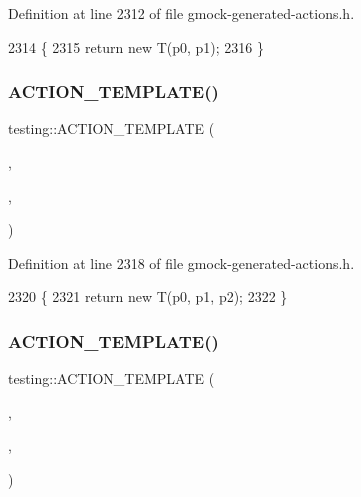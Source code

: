 Definition at line 2312 of file gmock-\/generated-\/actions.\+h.


\begin{DoxyCode}
2314                                             \{
2315   \textcolor{keywordflow}{return} \textcolor{keyword}{new} T(p0, p1);
2316 \}
\end{DoxyCode}
\mbox{\label{namespacetesting_ac24511eb64ebe2c2927feaf285ac3785}} 
\subsubsection{\texorpdfstring{A\+C\+T\+I\+O\+N\+\_\+\+T\+E\+M\+P\+L\+A\+T\+E()}{ACTION\_TEMPLATE()}\hspace{0.1cm}{\footnotesize\ttfamily [21/28]}}
{\footnotesize\ttfamily testing\+::\+A\+C\+T\+I\+O\+N\+\_\+\+T\+E\+M\+P\+L\+A\+TE (\begin{DoxyParamCaption}\item[{Return\+New}]{,  }\item[{H\+A\+S\+\_\+1\+\_\+\+T\+E\+M\+P\+L\+A\+T\+E\+\_\+\+P\+A\+R\+A\+MS(typename, T)}]{,  }\item[{A\+N\+D\+\_\+3\+\_\+\+V\+A\+L\+U\+E\+\_\+\+P\+A\+R\+A\+MS(p0, p1, p2)}]{ }\end{DoxyParamCaption})}



Definition at line 2318 of file gmock-\/generated-\/actions.\+h.


\begin{DoxyCode}
2320                                                 \{
2321   \textcolor{keywordflow}{return} \textcolor{keyword}{new} T(p0, p1, p2);
2322 \}
\end{DoxyCode}
\mbox{\label{namespacetesting_afc5a3710d11bdee2023d8402b84d86ed}} 
\subsubsection{\texorpdfstring{A\+C\+T\+I\+O\+N\+\_\+\+T\+E\+M\+P\+L\+A\+T\+E()}{ACTION\_TEMPLATE()}\hspace{0.1cm}{\footnotesize\ttfamily [22/28]}}
{\footnotesize\ttfamily testing\+::\+A\+C\+T\+I\+O\+N\+\_\+\+T\+E\+M\+P\+L\+A\+TE (\begin{DoxyParamCaption}\item[{Return\+New}]{,  }\item[{H\+A\+S\+\_\+1\+\_\+\+T\+E\+M\+P\+L\+A\+T\+E\+\_\+\+P\+A\+R\+A\+MS(typename, T)}]{,  }\item[{A\+N\+D\+\_\+4\+\_\+\+V\+A\+L\+U\+E\+\_\+\+P\+A\+R\+A\+MS(p0, p1, p2, p3)}]{ }\end{DoxyParamCaption})}



